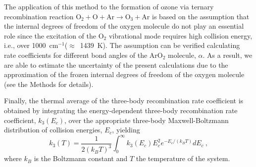 \documentclass[aps,prl,twocolumn,showpacs,preprintnumbers,amsmath,amssymb,floatfix]{revtex4-2}
\begin{document}
The application of this method to the formation of ozone via ternary recombination reaction $\mathrm{O}_2 + \mathrm{O} + \mathrm{Ar} \rightarrow \mathrm{O}_3 + \mathrm{Ar}$ is based on the assumption that the internal degrees of freedom of the oxygen molecule do not play an essential role since the excitation of the O$_2$ vibrational mode requires high collision energy, i.e., over 1000~cm$^{-1}$($\approx$~1439~K). 
The assumption can be verified calculating rate coefficients for different bond angles of the ArO$_2$ molecule, $\alpha$.
As a result, we are able to estimate the uncertainty of the present calculations due to the approximation of the frozen internal degrees of freedom of the oxygen molecule (see the Methods for details). 



Finally, the thermal average of the three-body recombination rate coefficient is obtained by integrating the energy-dependent three-body recombination rate coefficient, $k_3(E_c)$, over the appropriate three-body Maxwell-Boltzmann distribution of collision energies, $E_c$, yielding
\begin{equation}\label{eq:MBa}
	k_3(T) =  \frac{1}{2(k_B T)^3} \int_{0}^{\infty}k_3(E_c) E_c^2 e^{-E_c/(k_BT)} dE_c ~,
\end{equation}
where $k_B$ is the Boltzmann constant and $T$ the temperature of the system.



\end{document}
